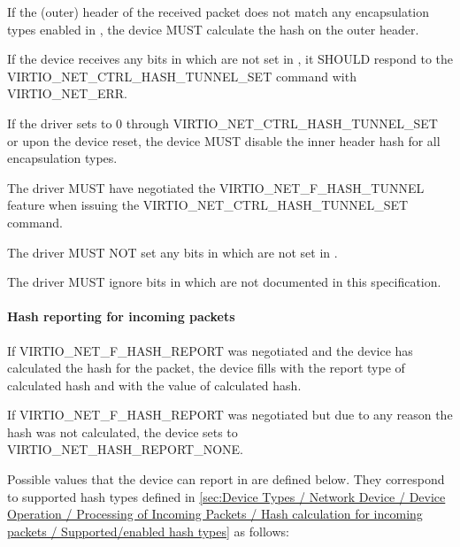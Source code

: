 
If the (outer) header of the received packet does not match any encapsulation types enabled
in , the device MUST calculate the hash on the outer header.

If the device receives any bits in  which are not set in ,
it SHOULD respond to the VIRTIO_NET_CTRL_HASH_TUNNEL_SET command with VIRTIO_NET_ERR.

If the driver sets  to 0 through VIRTIO_NET_CTRL_HASH_TUNNEL_SET or upon the device reset,
the device MUST disable the inner header hash for all encapsulation types.


The driver MUST have negotiated the VIRTIO_NET_F_HASH_TUNNEL feature when issuing the VIRTIO_NET_CTRL_HASH_TUNNEL_SET command.

The driver MUST NOT set any bits in  which are not set in .

The driver MUST ignore bits in  which are not documented in this specification.

\paragraph{Hash reporting for incoming packets}
\label{sec:Device Types / Network Device / Device Operation / Processing of Incoming Packets / Hash reporting for incoming packets}

If VIRTIO_NET_F_HASH_REPORT was negotiated and
 the device has calculated the hash for the packet, the device fills  with the report type of calculated hash
and  with the value of calculated hash.

If VIRTIO_NET_F_HASH_REPORT was negotiated but due to any reason the
hash was not calculated, the device sets  to VIRTIO_NET_HASH_REPORT_NONE.

Possible values that the device can report in  are defined below.
They correspond to supported hash types defined in
\ref{sec:Device Types / Network Device / Device Operation / Processing of Incoming Packets / Hash calculation for incoming packets / Supported/enabled hash types}
as follows:

